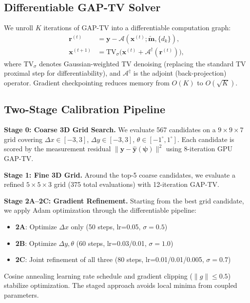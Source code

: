 \documentclass[runningheads]{llncs}
\begin{document}
\subsection{Differentiable GAP-TV Solver}

We unroll $K$ iterations of GAP-TV into a differentiable computation graph:
\begin{align}
    \mathbf{r}^{(t)} &= \mathbf{y} - \mathcal{A}(\mathbf{x}^{(t)}; \tilde{\mathbf{m}}, \{d_k\}), \\
    \mathbf{x}^{(t+1)} &= \text{TV}_\sigma\big(\mathbf{x}^{(t)} + \mathcal{A}^\dagger(\mathbf{r}^{(t)})\big),
\end{align}
where $\text{TV}_\sigma$ denotes Gaussian-weighted TV denoising (replacing the standard TV proximal step for differentiability), and $\mathcal{A}^\dagger$ is the adjoint (back-projection) operator.
Gradient checkpointing reduces memory from $O(K)$ to $O(\sqrt{K})$.

\subsection{Two-Stage Calibration Pipeline}

\textbf{Stage 0: Coarse 3D Grid Search.}
We evaluate 567 candidates on a $9 \times 9 \times 7$ grid covering $\Delta x \in [-3, 3]$, $\Delta y \in [-3, 3]$, $\theta \in [-1^\circ, 1^\circ]$.
Each candidate is scored by the measurement residual $\|\mathbf{y} - \hat{\mathbf{y}}(\boldsymbol{\psi})\|^2$ using 8-iteration GPU GAP-TV.

\textbf{Stage 1: Fine 3D Grid.}
Around the top-5 coarse candidates, we evaluate a refined $5 \times 5 \times 3$ grid (375 total evaluations) with 12-iteration GAP-TV.

\textbf{Stage 2A--2C: Gradient Refinement.}
Starting from the best grid candidate, we apply Adam optimization through the differentiable pipeline:
\begin{itemize}
    \item \textbf{2A}: Optimize $\Delta x$ only (50 steps, lr=0.05, $\sigma=0.5$)
    \item \textbf{2B}: Optimize $\Delta y, \theta$ (60 steps, lr=0.03/0.01, $\sigma=1.0$)
    \item \textbf{2C}: Joint refinement of all three (80 steps, lr=0.01/0.01/0.005, $\sigma=0.7$)
\end{itemize}
Cosine annealing learning rate schedule and gradient clipping ($\|g\| \leq 0.5$) stabilize optimization.
The staged approach avoids local minima from coupled parameters.
\end{document}
